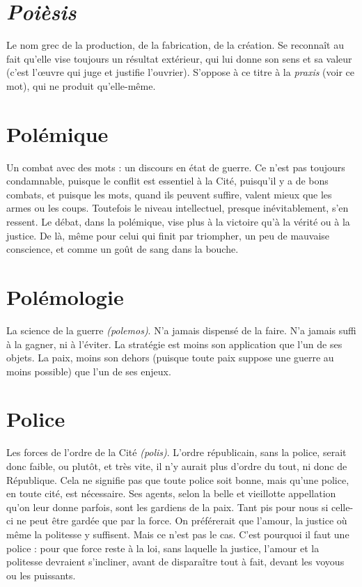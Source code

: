 \section{\it Poièsis}
Le nom grec de la production, de la fabrication, de la création. Se
reconnaît au fait qu’elle vise toujours un résultat extérieur, qui lui
donne son sens et sa valeur (c’est l’œuvre qui juge et justifie l’ouvrier). S'oppose
à ce titre à la {\it praxis} (voir ce mot), qui ne produit qu’elle-même.

\section{Polémique}
Un combat avec des mots : un discours en état de guerre. Ce
n'est pas toujours condamnable, puisque le conflit est essentiel
à la Cité, puisqu'il y a de bons combats, et puisque les mots, quand ils peuvent
suffire, valent mieux que les armes ou les coups. Toutefois le niveau intellectuel,
presque inévitablement, s’en ressent. Le débat, dans la polémique, vise
plus à la victoire qu’à la vérité ou à la justice. De là, même pour celui qui finit
par triompher, un peu de mauvaise conscience, et comme un goût de sang dans
la bouche.

\section{Polémologie}
La science de la guerre {\it (polemos)}. N’a jamais dispensé de
la faire. N'a jamais suffi à la gagner, ni à l’éviter. La stratégie
est moins son application que l’un de ses objets. La paix, moins son
dehors (puisque toute paix suppose une guerre au moins possible) que l’un de
ses enjeux.

\section{Police}
Les forces de l’ordre de la Cité {\it (polis)}. L'ordre républicain, sans la
police, serait donc faible, ou plutôt, et très vite, il n’y aurait plus
d'ordre du tout, ni donc de République. Cela ne signifie pas que toute
police soit bonne, mais qu’une police, en toute cité, est nécessaire. Ses
agents, selon la belle et vieillotte appellation qu’on leur donne parfois, sont
les gardiens de la paix. Tant pis pour nous si celle-ci ne peut être gardée que
par la force. On préférerait que l'amour, la justice où même la politesse y
suffisent. Mais ce n’est pas le cas. C’est pourquoi il faut une police : pour
que force reste à la loi, sans laquelle la justice, l’amour et la politesse
devraient s’incliner, avant de disparaître tout à fait, devant les voyous ou les
puissants.


